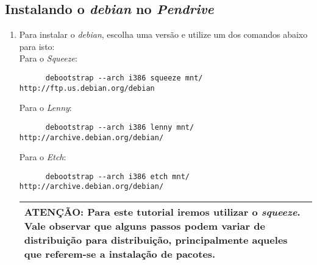 \documentclass[a4paper,10pt]{article}
\begin{document}
  \subsection{Instalando o \emph{debian} no \emph{Pendrive}}
    \begin{enumerate}
      \subsubsection{Instalando o debian}
      \item Para instalar o \emph{debian}, escolha uma versão e utilize um 
	    dos comandos abaixo para isto:\\
	Para o \emph{Squeeze}:
	\begin{lstlisting}
	  debootstrap --arch i386 squeeze mnt/ http://ftp.us.debian.org/debian
	\end{lstlisting}
	Para o \emph{Lenny}:
	\begin{lstlisting}
	  debootstrap --arch i386 lenny mnt/ http://archive.debian.org/debian/
	\end{lstlisting}
	Para o \emph{Etch}:
	\begin{lstlisting}
	  debootstrap --arch i386 etch mnt/ http://archive.debian.org/debian/
	\end{lstlisting}
	  \begin{center}
	    \begin{tabular}{|p{7cm}|}
	      \hline
		\textbf{ATENÇÃO}: Para este tutorial iremos utilizar o \emph{squeeze}. Vale observar que 
		alguns passos podem variar de distribuição para distribuição, principalmente aqueles
		que referem-se a instalação de pacotes. \\
	      \hline
	    \end{tabular}
	  \end{center}

\end{enumerate}
\end{document}
